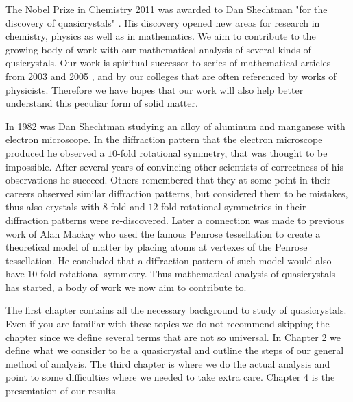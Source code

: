 \documentclass[text.tex]{subfiles}
\begin{document}
The Nobel Prize in Chemistry 2011 was awarded to Dan Shechtman "for the discovery of quasicrystals" \cite{nobel}. His discovery opened new areas for research in chemistry, physics as well as in mathematics. We aim to contribute to the growing body of work with our mathematical analysis of several kinds of qusicrystals. Our work is spiritual successor to series of mathematical articles from 2003 and 2005 \cite{classification}, \cite{classificationII} and \cite{classificationIII} by our colleges that are often referenced by works of physicists. Therefore we have hopes that our work will also help better understand this peculiar form of solid matter. 

In 1982 was Dan Shechtman studying an alloy of aluminum and manganese with electron microscope. In the diffraction pattern that the electron microscope produced he observed a $10$-fold rotational symmetry, that was thought to be impossible. After several years of convincing other scientists of correctness of his observations he succeed. Others remembered that they at some point in their careers observed similar diffraction patterns, but considered them to be mistakes, thus also crystals with $8$-fold and $12$-fold rotational symmetries in their diffraction patterns were re-discovered. Later a connection was made to previous work of Alan Mackay who used the famous Penrose tessellation to create a theoretical model of matter by placing atoms at vertexes of the Penrose tessellation. He concluded that a diffraction pattern of such model would also have $10$-fold rotational symmetry. Thus mathematical analysis of quasicrystals has started, a body of work we now aim to contribute to. 

The first chapter contains all the necessary background to study of quasicrystals. Even if you are familiar with these topics we do not recommend skipping the chapter since we define several terms that are not so universal. In Chapter 2 we define what we consider to be a quasicrystal and outline the steps of our general method of analysis. The third chapter is where we do the actual analysis and point to some difficulties where we needed to take extra care. Chapter 4 is the presentation of our results. 
\end{document}
